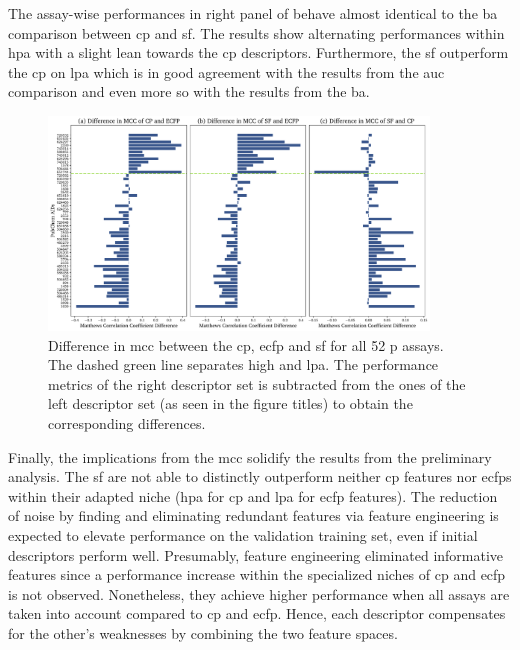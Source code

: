 The assay-wise performances in right panel of  behave almost identical to the \acl{ba} comparison between \ac{cp} and \acl{sf}. The results show alternating performances within \acl{hpa} with a slight lean towards the \ac{cp} descriptors. Furthermore, the \acl{sf} outperform the \ac{cp} on \acl{lpa} which is in good agreement with the results from the \ac{auc} comparison and even more so with the results from the \acl{ba}.\\
\begin{figure}[H]
	\centering
	\includegraphics[width=0.9\textwidth]{figures/MatCffComparison.pdf}
	\caption[Difference in \acl{mcc} Between the \ac{cp}, \ac{ecfp} and \acl{sf}]{Difference in \acl{mcc} between the \ac{cp}, \ac{ecfp} and \acl{sf} for all 52 \acl{p} assays. The dashed green line separates high and \acl{lpa}. The performance metrics of the right descriptor set is subtracted from the ones of the left descriptor set (as seen in the figure titles) to obtain the corresponding differences.}
	\label{fig:diffmatcff}
\end{figure}\noindent
Finally, the implications from the \acl{mcc} solidify the results from the preliminary analysis. The \acl{sf} are not able to distinctly outperform neither \ac{cp} features nor \acp{ecfp} within their adapted niche (\acl{hpa} for \ac{cp} and \acl{lpa} for \ac{ecfp} features). The reduction of noise by finding and eliminating redundant features via feature engineering is expected to elevate performance on the validation training set, even if initial descriptors perform well. Presumably, feature engineering eliminated informative features since a performance increase within the specialized niches of \ac{cp} and \ac{ecfp} is not observed. Nonetheless, they achieve higher performance when all assays are taken into account compared to \ac{cp} and \ac{ecfp}. Hence, each descriptor compensates for the other's weaknesses by combining the two feature spaces.\\
